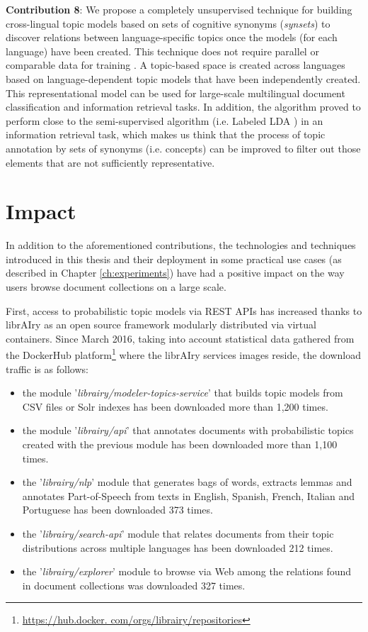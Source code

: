 \textbf{Contribution 8}: We propose a completely unsupervised technique for building cross-lingual topic models based on sets of cognitive synonyms (\textit{synsets}) \citep{Miller1995WordNet:English} to discover relations between language-specific topics once the models (for each language) have been created. This technique does not require parallel or comparable data for training \citep{Badenes-Olmedo2019, Badenes-Olmedo2019b}. A topic-based space is created across languages based on language-dependent topic models that have been independently created. This representational model can be used for large-scale multilingual document classification and information retrieval tasks. In addition, the algorithm proved to perform close to the semi-supervised algorithm (i.e. Labeled LDA \citep{Ramage2009a} )  in an information retrieval task, which makes us think that the process of topic annotation by sets of synonyms (i.e. concepts) can be improved to filter out those elements that are not sufficiently representative.


\section{Impact}

In addition to the aforementioned contributions, the technologies and techniques introduced in this thesis and their deployment in some practical use cases (as described in Chapter \ref{ch:experiments}) have had a positive impact on the way users browse document collections on a large scale.

First, access to probabilistic topic models via REST APIs has increased thanks to librAIry as an open source framework modularly distributed via virtual containers. Since March 2016, taking into account statistical data gathered from the DockerHub platform\footnote{\url{https://hub.docker. com/orgs/librairy/repositories}} where the librAIry services images reside, the download traffic is as follows:
\begin{itemize}
\item the module '\textit{librairy/modeler-topics-service}' that builds topic models from CSV files or Solr indexes has been downloaded more than 1,200 times.
\item the module '\textit{librairy/api}' that annotates documents with probabilistic topics created with the previous module has been downloaded more than 1,100 times.
\item the '\textit{librairy/nlp}' module that generates bags of words, extracts lemmas and annotates Part-of-Speech from texts in English, Spanish, French, Italian and Portuguese has been downloaded 373 times.
\item the '\textit{librairy/search-api}' module that relates documents from their topic distributions across multiple languages has been downloaded 212 times.
\item the '\textit{librairy/explorer}' module to browse via Web among the relations found in document collections was downloaded 327 times.
\end{itemize}

